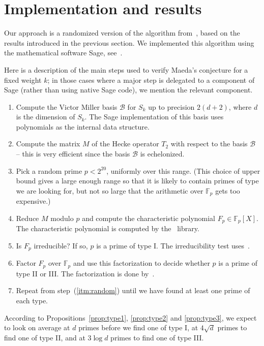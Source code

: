 \documentclass[11pt]{article}
\theoremstyle{plain}
\theoremstyle{definition}
\theoremstyle{remark}
\numberwithin{equation}{section}
\newcommand{\FF}{\mathbb{F}}
\newcommand{\cB}{\mathcal{B}}
\begin{document}
\section{Implementation and results}
\label{sect:implementation}
Our approach is a randomized version of the algorithm
from~\cite{ConreyFarmer}, based on the results introduced in the previous
section.  We implemented this algorithm using the mathematical software Sage, 
see~\cite{Sage}.

Here is a description of the main steps used to verify Maeda's conjecture for
a fixed weight $k$; in those cases where a major step is delegated to a
component of Sage (rather than using native Sage code), we mention the
relevant component.
\begin{enumerate}
  \item\label{itm:vmbasis} Compute the Victor Miller basis $\cB$ for $S_k$ up 
    to precision
    $2(d+2)$, where $d$ is the dimension of $S_k$.  The Sage implementation of
    this basis uses~\cite{FLINT} polynomials as the internal data structure.
  \item\label{itm:hecke} Compute the matrix $M$ of the Hecke operator $T_2$ 
    with respect to the
    basis $\cB$ -- this is very efficient since the basis $\cB$ is
    echelonized.
  \item\label{itm:random} Pick a random prime $p<2^{20}$, uniformly over this
    range.  (This choice of upper
    bound gives a large enough range so that it is likely to contain primes of
    type we are looking for, but not so large that the arithmetic over $\FF_p$
    gets too expensive.)
  \item Reduce $M$ modulo $p$ and compute the characteristic polynomial
    $F_p\in \FF_p[X]$.  The characteristic polynomial is computed by
    the~\cite{Linbox} library.
  \item Is $F_p$ irreducible?  If so, $p$ is a prime of type I.  The
    irreducibility test uses~\cite{FLINT}.
  \item Factor $F_p$ over $\FF_p$ and use this factorization to decide whether
    $p$ is a prime of type II or III.  The factorization is done
    by~\cite{FLINT}.
  \item Repeat from step~(\ref{itm:random}) until we have found at
    least one prime of each type.
\end{enumerate}

According to Propositions~\ref{prop:type1}, \ref{prop:type2} and
\ref{prop:type3}, we expect to look on average at $d$ primes before we find
one of type I, at $4\sqrt{d}$ primes to find one of type II, and at $3\log d$
primes to find one of type III.
\end{document}
